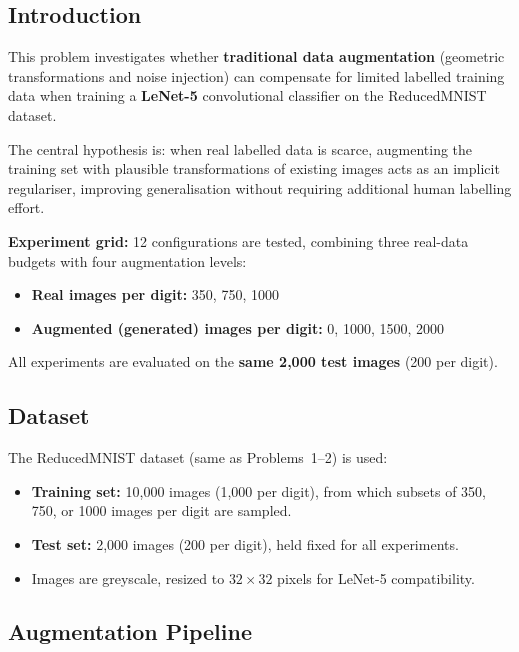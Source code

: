 \documentclass[12pt, a4paper]{article}
\begin{document}
\subsection{Introduction}

This problem investigates whether \textbf{traditional data augmentation} (geometric
transformations and noise injection) can compensate for limited labelled training data
when training a \textbf{LeNet-5} convolutional classifier on the ReducedMNIST dataset.

The central hypothesis is: when real labelled data is scarce, augmenting the training
set with plausible transformations of existing images acts as an implicit regulariser,
improving generalisation without requiring additional human labelling effort.

\textbf{Experiment grid:} 12 configurations are tested, combining three real-data
budgets with four augmentation levels:
\begin{itemize}
    \item \textbf{Real images per digit:} 350, 750, 1000
    \item \textbf{Augmented (generated) images per digit:} 0, 1000, 1500, 2000
\end{itemize}

All experiments are evaluated on the \textbf{same 2{,}000 test images} (200 per digit).

\subsection{Dataset}

The ReducedMNIST dataset (same as Problems~1--2) is used:
\begin{itemize}
    \item \textbf{Training set:} 10{,}000 images (1{,}000 per digit), from which subsets
          of 350, 750, or 1000 images per digit are sampled.
    \item \textbf{Test set:} 2{,}000 images (200 per digit), held fixed for all experiments.
    \item Images are greyscale, resized to $32 \times 32$ pixels for LeNet-5 compatibility.
\end{itemize}

\subsection{Augmentation Pipeline}
\end{document}
